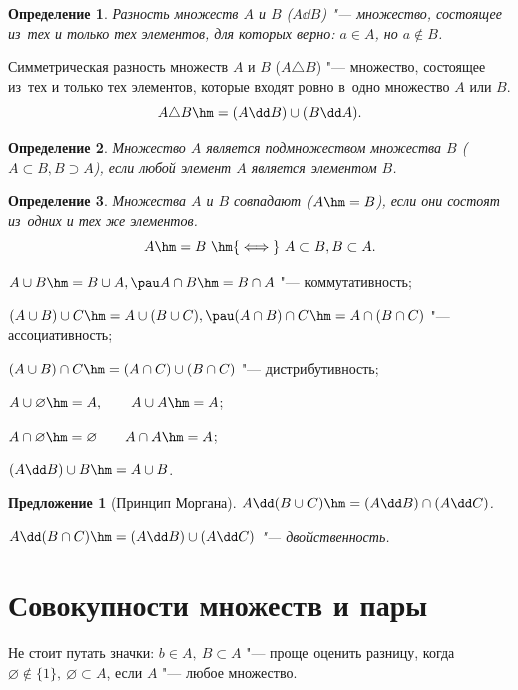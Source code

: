 \documentclass[a4paper,10pt,twoside]{article}
\newtheorem{Def}{Определение}[section]
\newtheorem{Pre}{Предложение}[section]
\let\AVsection\section{}
\renewcommand\section{\newpage\scol\AVsection}
\newcommand{\scol}{  \renewcommand{\headrulewidth}{0.5pt}\fancyhead[RE,LO]{\thesection{} \leftmark} \fancyhead[LE,RO]{\thepage}}
\begin{document}
\begin{Def}
    Разность множеств $A$ и $B$ ($A\dd B$) "--- множество, состоящее из~тех и только тех элементов, для которых верно: $a\in A$, но $a\notin B$.


\end{Def}


    Симметрическая разность множеств $A$ и $B$ ($A\triangle B$) "--- множество, состоящее из~тех и только тех элементов,
     которые входят ровно в~одно множество $A$ или $B$.
    $$    A\triangle B\hm=(A\dd B)\cup (B\dd A).   $$



\begin{Def}
    Множество $A$ является подмножеством множества $B$ ($A\subset B, B \supset A$), если любой элемент $A$ является элементом $B$.
\end{Def}

\begin{Def}
    Множества $A$ и $B$ совпадают ($A\hm=B$), если они состоят из~одних и тех же элементов.
        $$A\hm=B\ \hm{\iff}\ A\subset B,B\subset A.$$
\end{Def}

$A\cup B\hm=B\cup A,\pau A\cap B\hm=B\cap A$ "--- коммутативность;

$(A\cup B)\cup C\hm=A\cup (B\cup C),\pau(A\cap B)\cap C\hm=A\cap (B\cap C)$ "--- ассоциативность;

$(A\cup B)\cap C\hm=(A\cap C)\cup(B\cap C)$ "--- дистрибутивность;

$A\cup \varnothing\hm=A,\qquad A\cup A\hm=A$;

$A\cap \varnothing\hm=\varnothing\qquad A\cap A\hm=A$;

$(A\dd B)\cup B\hm=A\cup B$.

\begin{Pre}[Принцип Моргана]\label{PM} $A\dd(B\cup C)\hm=(A\dd B)\cap (A\dd C)$.


    $A\dd(B\cap C)\hm=(A\dd B)\cup (A\dd C)$ "--- двойственность.
\end{Pre}
\section{Совокупности множеств и пары}

Не стоит путать значки: $b\in A, \ B\subset A$ "--- проще оценить разницу, когда
 $\varnothing\notin\{1\},\ \varnothing\subset A$, если $A$ "--- любое множество.
\end{document}

